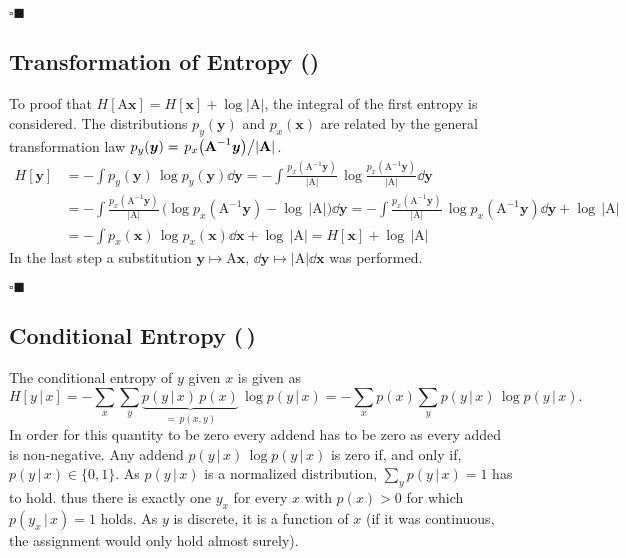 \documentclass[11pt, a4paper]{scrartcl}
\renewcommand{\vec}[1]{\bm{#1}}
\newcommand{\mat}[1]{\bm{\mathrm{#1}}}
\newcommand{\given}{\,\vert\,}
\newcommand{\qedeot}{\hfill\(\square\blacksquare\)}
\newcommand{\diffstar}{\texorpdfstring{\raisebox{-1pt}{\resizebox{!}{8pt}{\(\star\)}}}{*}}
\newcommand{\onestar}  {(\diffstar)}
\newcommand{\twostar}  {(\diffstar\,\diffstar)}
\begin{document}
			\qedeot

		\subsection{Transformation of Entropy  \onestar}
			To proof that \( H[\mat{A} \vec{x}] = H[\vec{x}] + \log \lvert \mat{A} \rvert \), the integral of the first entropy is considered. The distributions \( p_y(\vec{y}) \) and \( p_x(\vec{x}) \) are related by the general transformation law \( p_y(\vec{y}) = \flatfrac{p_x\big(\mat{A}^{-1} \vec{y}\big)}{\lvert \mat{A} \rvert} \).
			\begin{align}
				H[\vec{y}]
					&= -\!\int\! p_y(\vec{y}) \, \log p_y(\vec{y}) \dd{\vec{y}}
					 = -\!\int\! \frac{p_x(\mat{A}^{-1} \vec{y})}{\lvert \mat{A} \rvert} \, \log \frac{p_x(\mat{A}^{-1} \vec{y})}{\lvert \mat{A} \rvert} \dd{\vec{y}} \\
					&= -\!\int\! \frac{p_x(\mat{A}^{-1} \vec{y})}{\lvert \mat{A} \rvert} \, \big(\! \log p_x(\mat{A}^{-1} \vec{y}) - \log \,\lvert \mat{A} \rvert \big) \dd{\vec{y}}
					 = -\!\int\! \frac{p_x(\mat{A}^{-1} \vec{y})}{\lvert \mat{A} \rvert} \, \log p_x(\mat{A}^{-1} \vec{y}) \dd{\vec{y}} + \log \,\lvert \mat{A} \rvert \\
					&= -\!\int\! p_x(\vec{x}) \, \log p_x(\vec{x}) \dd{\vec{x}} + \log \,\lvert \mat{A} \rvert
					 = H[\vec{x}] + \log \,\lvert \mat{A} \rvert
			\end{align}
			In the last step a substitution \( \vec{y} \mapsto \mat{A} \vec{x} \), \( \dd \vec{y} \mapsto \lvert \mat{A} \rvert \dd{\vec{x}} \) was performed.

			\qedeot

		\subsection{Conditional Entropy  \twostar}
			The conditional entropy of \(y\) given \(x\) is given as
			\begin{equation}
				H[y \given x]
					= -\sum_x \sum_y \underbrace{p(y \given x) \, p(x)}_{=\, p(x, y)} \, \log p(y \given x)
					= -\sum_x p(x) \sum_y p(y \given x) \, \log p(y \given x).
			\end{equation}
			In order for this quantity to be zero every addend has to be zero as every added is non-negative. Any addend \( p(y \given x) \, \log p(y \given x) \) is zero if, and only if, \( p(y \given x) \in \{ 0, 1 \} \). As \( p(y \given x) \) is a normalized distribution, \( \sum_y p(y \given x) = 1 \) has to hold. thus there is exactly one \( y_x \) for every \(x\) with \( p(x) > 0 \) for which \( p(y_x \given x) = 1 \) holds. As \(y\) is discrete, it is a function of \(x\) (if it was continuous, the assignment would only hold almost surely).
\end{document}
